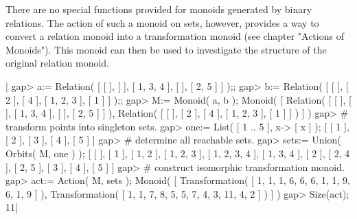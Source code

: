 
There  are no special functions  provided for monoids generated by binary
relations.  The action of such a monoid on sets,  however, provides a way
to  convert a relation  monoid into a  transformation monoid (see chapter
"Actions  of Monoids").  This monoid can  then be used to investigate the
structure of the original relation monoid.

|    gap> a:= Relation( [ [  ], [  ], [ 1, 3, 4 ], [  ], [ 2, 5 ] ] );;
    gap> b:= Relation( [ [  ], [ 2 ], [ 4 ], [ 1, 2, 3 ], [ 1 ] ] );;
    gap> M:= Monoid( a, b );
    Monoid( [ Relation( [ [  ], [  ], [ 1, 3, 4 ], [  ], [ 2, 5 ] ] ), 
      Relation( [ [  ], [ 2 ], [ 4 ], [ 1, 2, 3 ], [ 1 ] ] ) ] )
    gap> # transform points into singleton sets.
    gap> one:= List( [ 1 .. 5 ], x-> [ x ] );
    [ [ 1 ], [ 2 ], [ 3 ], [ 4 ], [ 5 ] ]
    gap> # determine all reachable sets.
    gap> sets:= Union( Orbits( M, one ) ); 
    [ [  ], [ 1 ], [ 1, 2 ], [ 1, 2, 3 ], [ 1, 2, 3, 4 ], [ 1, 3, 4 ], 
      [ 2 ], [ 2, 4 ], [ 2, 5 ], [ 3 ], [ 4 ], [ 5 ] ]
    gap> # construct isomorphic transformation monoid.
    gap> act:= Action( M, sets ); 
    Monoid( [ Transformation( [ 1, 1, 1, 6, 6, 6, 1, 1, 9, 6, 1, 9 ] ), 
      Transformation( [ 1, 1, 7, 8, 5, 5, 7, 4, 3, 11, 4, 2 ] ) ] )
    gap> Size(act);
    11|




